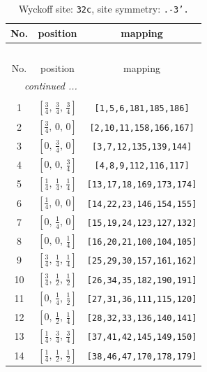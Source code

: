 \documentclass[fleqn,8pt]{jsarticle}
\begin{document}
\begin{longtable}{ccc}
\caption{Wyckoff site: {\tt 32c}, site symmetry: {\tt .-3'.}}
 \\
 \hline \hline
No. & position & mapping \\ \hline \endfirsthead

\multicolumn{2}{l}{\tablename\ \thetable{}} \\
 \hline \hline
No. & position & mapping \\ \hline \endhead

 \hline \hline
\multicolumn{2}{r}{\footnotesize\it continued ...} \\ \endfoot

 \hline \hline
\multicolumn{2}{r}{} \\ \endlastfoot

1 & $\left[ \frac{3}{4},\, \frac{3}{4},\, \frac{3}{4} \right]$ & {\tt [1,5,6,181,185,186]} \\ \hline
2 & $\left[ \frac{3}{4},\, 0,\, 0 \right]$ & {\tt [2,10,11,158,166,167]} \\ \hline
3 & $\left[ 0,\, \frac{3}{4},\, 0 \right]$ & {\tt [3,7,12,135,139,144]} \\ \hline
4 & $\left[ 0,\, 0,\, \frac{3}{4} \right]$ & {\tt [4,8,9,112,116,117]} \\ \hline
5 & $\left[ \frac{1}{4},\, \frac{1}{4},\, \frac{1}{4} \right]$ & {\tt [13,17,18,169,173,174]} \\ \hline
6 & $\left[ \frac{1}{4},\, 0,\, 0 \right]$ & {\tt [14,22,23,146,154,155]} \\ \hline
7 & $\left[ 0,\, \frac{1}{4},\, 0 \right]$ & {\tt [15,19,24,123,127,132]} \\ \hline
8 & $\left[ 0,\, 0,\, \frac{1}{4} \right]$ & {\tt [16,20,21,100,104,105]} \\ \hline
9 & $\left[ \frac{3}{4},\, \frac{1}{4},\, \frac{1}{4} \right]$ & {\tt [25,29,30,157,161,162]} \\ \hline
10 & $\left[ \frac{3}{4},\, \frac{1}{2},\, \frac{1}{2} \right]$ & {\tt [26,34,35,182,190,191]} \\ \hline
11 & $\left[ 0,\, \frac{1}{4},\, \frac{1}{2} \right]$ & {\tt [27,31,36,111,115,120]} \\ \hline
12 & $\left[ 0,\, \frac{1}{2},\, \frac{1}{4} \right]$ & {\tt [28,32,33,136,140,141]} \\ \hline
13 & $\left[ \frac{1}{4},\, \frac{3}{4},\, \frac{3}{4} \right]$ & {\tt [37,41,42,145,149,150]} \\ \hline
14 & $\left[ \frac{1}{4},\, \frac{1}{2},\, \frac{1}{2} \right]$ & {\tt [38,46,47,170,178,179]} \\ \hline

\end{longtable}
\end{document}
